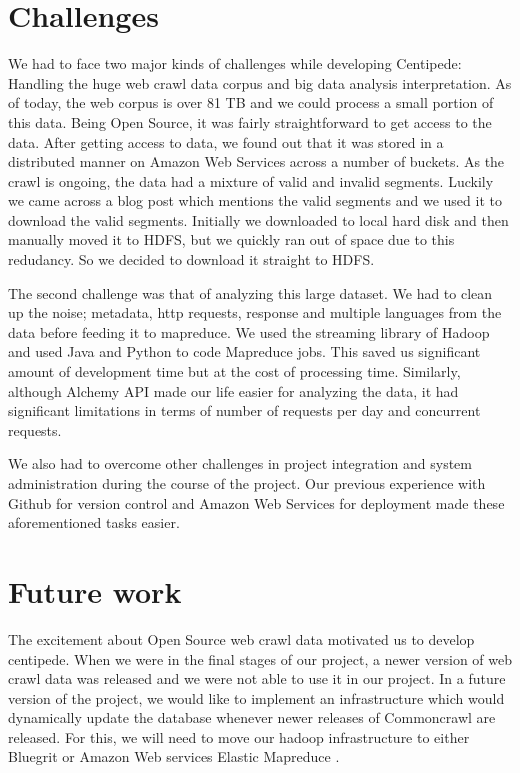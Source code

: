 \documentclass[conference]{IEEEtran}
\begin{document}
\section{Challenges}

We had to face two major kinds of challenges while developing Centipede: Handling the huge web crawl data corpus and big data analysis interpretation. As of today, the web corpus is over 81 TB and we could process a small portion of this data. Being Open Source, it was fairly straightforward to get access to the data. After getting access to data, we found out that it was stored in a distributed manner on Amazon Web Services across a number of buckets\cite{aws:bucket}. As the crawl is ongoing, the data had a mixture of valid and invalid segments. Luckily we came across a blog post which mentions the valid segments and we used it to download the valid segments. Initially we downloaded to local hard disk and then manually moved it to HDFS, but we quickly ran out of space due to this redudancy. So we decided to download it straight to HDFS.

The second challenge was that of analyzing this large dataset. We had to clean up the noise; metadata, http requests, response and multiple languages from the data before feeding it to mapreduce. We used the streaming library of Hadoop and used Java and Python to code Mapreduce jobs. This saved us significant amount of development time but at the cost of processing time. Similarly, although Alchemy API made our life easier for analyzing the data, it had significant limitations in terms of number of requests per day and concurrent requests.

We also had to overcome other challenges in project integration and system administration during the course of the project. Our previous experience with Github for version control and Amazon Web Services for deployment made these aforementioned tasks easier. 

\section{Future work}

The excitement about Open Source web crawl data motivated us to develop centipede. When we were in the final stages of our project, a newer version of web crawl data was released and we were not able to use it in our project. In a future version of the project, we would like to implement an infrastructure which would dynamically update the database whenever newer releases of Commoncrawl are released. For this, we will need to move our hadoop infrastructure to either Bluegrit or Amazon Web services Elastic Mapreduce \cite{aws:emr}. 
\end{document}
